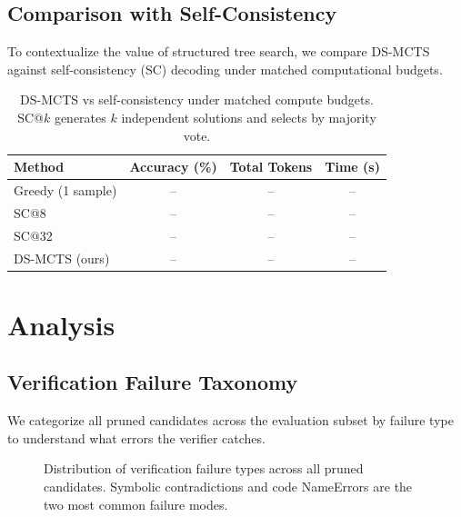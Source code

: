 \documentclass[11pt,a4paper]{article}
\begin{document}
\subsection{Comparison with Self-Consistency}

To contextualize the value of structured tree search, we compare DS-MCTS
against self-consistency (SC) decoding \citep{wang2023selfconsistency} under
matched computational budgets.

\begin{table}[h]
\centering
\caption{DS-MCTS vs self-consistency under matched compute budgets. SC@$k$
generates $k$ independent solutions and selects by majority vote.}
\label{tab:sc_comparison}
\begin{tabular}{lccc}
\toprule
\textbf{Method} & \textbf{Accuracy (\%)} & \textbf{Total Tokens} & \textbf{Time (s)} \\
\midrule
Greedy (1 sample)  & -- & -- & -- \\
SC@8               & -- & -- & -- \\
SC@32              & -- & -- & -- \\
DS-MCTS (ours)     & -- & -- & -- \\
\bottomrule
\end{tabular}
\end{table}



\section{Analysis}
\label{sec:analysis}

\subsection{Verification Failure Taxonomy}

We categorize all pruned candidates across the evaluation subset by failure
type to understand what errors the verifier catches.

\begin{figure}[h]
\centering
\caption{Distribution of verification failure types across all pruned candidates.
Symbolic contradictions and code NameErrors are the two most common failure
modes.}
\label{fig:failure_types}
\end{figure}
\end{document}

